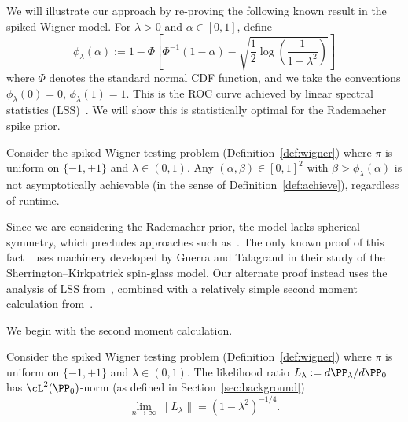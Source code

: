 \documentclass[11pt]{article}
\begin{document}
We will illustrate our approach by re-proving the following known result in the spiked Wigner model. For $\lambda > 0$ and $\alpha \in [0,1]$, define
\begin{equation}\label{eq:phi_lambda}
\phi_\lambda(\alpha) := 1 - \Phi\left[\Phi^{-1}(1-\alpha) - \sqrt{\frac{1}{2} \log\left(\frac{1}{1-\lambda^2}\right)}\right]
\end{equation}
where $\Phi$ denotes the standard normal CDF function, and we take the conventions $\phi_\lambda(0) = 0$, $\phi_\lambda(1) = 1$. This is the ROC curve achieved by linear spectral statistics (LSS)~\cite{weak-wigner}. We will show this is statistically optimal for the Rademacher spike prior.

\begin{theorem}
\label{thm:main-stat}
Consider the spiked Wigner testing problem (Definition~\ref{def:wigner}) where $\pi$ is uniform on $\{-1,+1\}$ and $\lambda \in (0,1)$. Any $(\alpha,\beta) \in [0,1]^2$ with $\beta > \phi_\lambda(\alpha)$ is not asymptotically achievable (in the sense of Definition~\ref{def:achieve}), regardless of runtime.
\end{theorem}

\noindent Since we are considering the Rademacher prior, the model lacks spherical symmetry, which precludes approaches such as~\cite{sphericity,BL-free-1,BL-free-2}. The only known proof of this fact~\cite{fund-limits-wigner} uses machinery developed by Guerra and Talagrand in their study of the Sherrington--Kirkpatrick spin-glass model. Our alternate proof instead uses the analysis of LSS from~\cite{weak-wigner}, combined with a relatively simple second moment calculation from~\cite{opt-subopt}.

We begin with the second moment calculation.

\begin{theorem}
\label{thm:L-bound-rad}
Consider the spiked Wigner testing problem (Definition~\ref{def:wigner}) where $\pi$ is uniform on $\{-1,+1\}$ and $\lambda \in (0,1)$. The likelihood ratio $L_\lambda := d\PP_\lambda/d\PP_0$ has $\cL^2(\PP_0)$-norm (as defined in Section~\ref{sec:background})
\begin{equation}\label{eq:L-bound-rad}
\lim_{n \to \infty} \|L_\lambda\| = (1-\lambda^2)^{-1/4}.
\end{equation}
\end{theorem}
\end{document}

